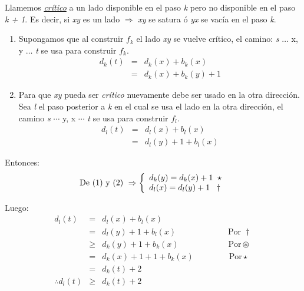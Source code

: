 \documentclass[12pt,a4paper]{report}
\begin{document}
  			\par Llamemos \textit{\underline{crítico}} a un lado disponible en el paso \textit{k} pero no disponible en el paso \textit{k + 1}. Es decir, si \textit{xy} es un lado $\Rightarrow$ \textit{xy} se satura ó \textit{yx} se vacía en el paso \textit{k}.
  			\begin{enumerate}
  				\item Supongamos que al construir $f_{k}$ el lado \textit{xy} se vuelve crítico, el camino: \textit{s} $\dotsc$ x, y $\dotsc$ \textit{t} se usa para construir $f_{k}$.
  				\begin{eqnarray}
  					\nonumber d_{k}(\textit{t}) &=& d_{k}(x) + b_{k}(x) \\
  					\nonumber &=& d_{k}(x) + b_{k}(y) + 1
  				\end{eqnarray}

  				\item Para que \textit{xy} pueda ser \textit{crítico} nuevamente debe ser usado en la otra dirección. Sea \textit{l} el paso posterior a \textit{k} en el cual se usa el lado en la otra dirección, el camino \textit{s} $\dotsb$ y, x $\dotsb$ \textit{t} se usa para construir $f_{l}$.
  				\begin{eqnarray}
  					\nonumber d_{l}(t) &=& d_{l}(x) + b_{l}(x) \\
  					\nonumber &=& d_{l}(y) + 1 + b_{l}(x)
  				\end{eqnarray}
  			\end{enumerate}

  			\par Entonces:
  			\begin{equation*}
  				\textup{De (1) y (2) } \Rightarrow
  	  		\left \lbrace
  	  		\begin{array}{l}
  					d_{k}(y) = d_{k}(x) + 1 \; \; \star \\
  	    		d_{l}(x) = d_{l}(y) + 1 \; \; \; \dag
  	  		\end{array}
  	  		\right.
  			\end{equation*}

  			\par Luego:
  			\begin{eqnarray}
  				\nonumber d_{l}(t) &=& d_{l}(x) + b_{l}(x) \\
  				\nonumber &=& d_{l}(y) + 1 + b_{l}(x) \qquad\qquad\qquad\;\text{Por } \dag \\
  				\nonumber & \geq & d_{k}(y) + 1 + b_{k}(x) \qquad\qquad\qquad\text{Por} \circledast \\
  				\nonumber &=& d_{k}(x) + 1 + 1 + b_{k}(x) \;\qquad\qquad\text{Por} \star \\
  				\nonumber &=& d_{k}(\textit{t}) + 2 \\
  				\nonumber \therefore d_{l}(\textit{t}) & \geq & d_{k}(\textit{t}) + 2
  			\end{eqnarray}
\end{document}
